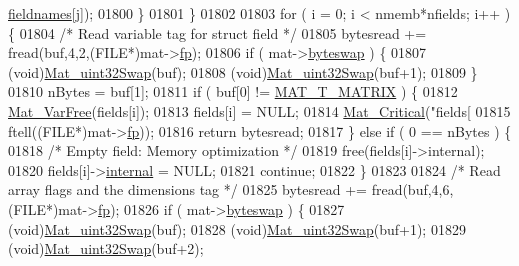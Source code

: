 \begin{DoxyCode}
{{{{{{{{{{{{{{{      \hyperlink{structmatvar__internal_a7574d000bfc98ad4860ae6590b8d4985}{fieldnames}[j]);
01800             \}
01801         \}
01802 
01803         \textcolor{keywordflow}{for} ( i = 0; i < nmemb*nfields; i++ ) \{
01804             \textcolor{comment}{/* Read variable tag for struct field */}
01805             bytesread += fread(buf,4,2,(FILE*)mat->\hyperlink{struct__mat__t_a85f562e407ca9ad4d2a6e14f839432b7}{fp});
01806             \textcolor{keywordflow}{if} ( mat->\hyperlink{struct__mat__t_a99d207977af5e04941ace56d71817a40}{byteswap} ) \{
01807                 (void)\hyperlink{endian_8c_a8cb0d0750e2eaf9840d95db531934f4f}{Mat\_uint32Swap}(buf);
01808                 (void)\hyperlink{endian_8c_a8cb0d0750e2eaf9840d95db531934f4f}{Mat\_uint32Swap}(buf+1);
01809             \}
01810             nBytes = buf[1];
01811             \textcolor{keywordflow}{if} ( buf[0] != \hyperlink{group___m_a_t_ggacf7b3b879282b7ab3a51190e49bf3453a32985fee89a4df8db4b3f5d3a48823d3}{MAT\_T\_MATRIX} ) \{
01812                 \hyperlink{group___m_a_t_ga1d14716f7450530fd1c9d02413787f0e}{Mat\_VarFree}(fields[i]);
01813                 fields[i] = NULL;
01814                 \hyperlink{group__mat__util_gaf51f2bfbb5580f575e4dd79757e2b80c}{Mat\_Critical}(\textcolor{stringliteral}{"fields[%
01815                     ftell((FILE*)mat->\hyperlink{struct__mat__t_a85f562e407ca9ad4d2a6e14f839432b7}{fp}));
01816                 \textcolor{keywordflow}{return} bytesread;
01817             \} \textcolor{keywordflow}{else} \textcolor{keywordflow}{if} ( 0 == nBytes ) \{
01818                 \textcolor{comment}{/* Empty field: Memory optimization */}
01819                 free(fields[i]->\textcolor{keyword}{internal});
01820                 fields[i]->\hyperlink{group___m_a_t_a6e97e3ed9f40c49322c18561c2a94e92}{internal} = NULL;
01821                 \textcolor{keywordflow}{continue};
01822             \}
01823 
01824             \textcolor{comment}{/* Read array flags and the dimensions tag */}
01825             bytesread += fread(buf,4,6,(FILE*)mat->\hyperlink{struct__mat__t_a85f562e407ca9ad4d2a6e14f839432b7}{fp});
01826             \textcolor{keywordflow}{if} ( mat->\hyperlink{struct__mat__t_a99d207977af5e04941ace56d71817a40}{byteswap} ) \{
01827                 (void)\hyperlink{endian_8c_a8cb0d0750e2eaf9840d95db531934f4f}{Mat\_uint32Swap}(buf);
01828                 (void)\hyperlink{endian_8c_a8cb0d0750e2eaf9840d95db531934f4f}{Mat\_uint32Swap}(buf+1);
01829                 (void)\hyperlink{endian_8c_a8cb0d0750e2eaf9840d95db531934f4f}{Mat\_uint32Swap}(buf+2);
}}}}}}}}}}}}}}}}
\end{DoxyCode}
